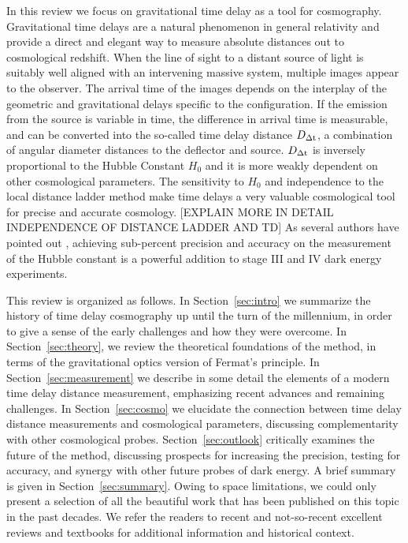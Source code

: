 In this review we focus on gravitational time delay as a tool for
cosmography.  Gravitational time delays are a natural phenomenon in
general relativity and provide a direct and elegant way to measure
absolute distances out to cosmological redshift. When the line of
sight to a distant source of light is suitably well aligned with an
intervening massive system, multiple images appear to the
observer. The arrival time of the images depends on the interplay of
the geometric and gravitational delays specific to the
configuration. If the emission from the source is variable in time,
the difference in arrival time is measurable, and can be converted
into the so-called time delay distance $D_{\Delta{\rm t}}$, a combination of
angular diameter distances to the deflector and source. $D_{\Delta{\rm t}}$ is
inversely proportional to the Hubble Constant $H_0$ and it is more
weakly dependent on other cosmological parameters. The sensitivity to
$H_0$ and independence to the local distance ladder method make time
delays a very valuable cosmological tool for precise and accurate
cosmology. [EXPLAIN MORE IN DETAIL INDEPENDENCE OF DISTANCE LADDER AND
TD] As several authors have pointed out
\citep{Lin11,Suy++12,Wei++13}, achieving sub-percent precision and
accuracy on the measurement of the Hubble constant is a powerful
addition to stage III and IV dark energy experiments.

This review is organized as follows. In Section~\ref{sec:intro} we
summarize the history of time delay cosmography up until the turn of
the millennium, in order to give a sense of the early challenges and
how they were overcome. In Section~\ref{sec:theory}, we review the
theoretical foundations of the method, in terms of the gravitational
optics version of Fermat's principle. In Section~\ref{sec:measurement}
we describe in some detail the elements of a modern time delay
distance measurement, emphasizing recent advances and remaining
challenges. In Section~\ref{sec:cosmo} we elucidate the connection
between time delay distance measurements and cosmological parameters,
discussing complementarity with other cosmological
probes. Section~\ref{sec:outlook} critically examines the future of
the method, discussing prospects for increasing the precision, testing
for accuracy, and synergy with other future probes of dark energy. A
brief summary is given in Section~\ref{sec:summary}. Owing to space
limitations, we could only present a selection of all the beautiful
work that has been published on this topic in the past decades. We
refer the readers to recent
\citep{Bar10,Ell10,Tre10,TMC12,Jackson:2013p30763,Jac15,T+E15} and not-so-recent \citep{B+N92,CSS02,K+S04,Fal05,SKW06}
excellent reviews and textbooks \citep{SEF92} for additional
information and historical context.

